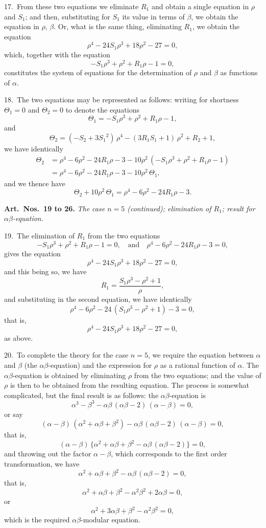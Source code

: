 \documentclass[11pt,a4paper]{book}
\begin{document}
17.\ From these two equations we eliminate $R_1$ and obtain a single equation in $\rho$ and
$S_1$; and then, substituting for $S_1$ its value in terms of $\beta$, we obtain the equation in
$\rho$, $\beta$. Or, what is the same thing, eliminating $R_1$, we obtain the equation
\[
\rho^4 - 24S_1 \rho^3 + 18\rho^2 - 27 = 0,
\]
which, together with the equation
\[
-S_1 \rho^3 + \rho^2 + R_1 \rho - 1 = 0,
\]
constitutes the system of equations for the determination of $\rho$ and $\beta$ as functions of $\alpha$.

18.\ The two equations may be represented as follows: writing for shortness
$\Theta_1 = 0$ and $\Theta_2 = 0$ to denote the equations
\[
\Theta_1 = -S_1 \rho^3 + \rho^2 + R_1 \rho - 1,
\]
and
\[
\Theta_2 = (-S_2 + 3S_1{}^2)\, \rho^4 - (3R_1 S_1 + 1)\, \rho^2 + R_2 + 1,
\]
we have identically
\begin{align*}
\Theta_2 &= \rho^4 - 6\rho^2 - 24R_1 \rho - 3
- 10\rho^2\, (-S_1 \rho^3 + \rho^2 + R_1 \rho - 1)\\
&= \rho^4 - 6\rho^2 - 24R_1 \rho - 3 - 10\rho^2\, \Theta_1,
\end{align*}
and we thence have
\[
\Theta_2 + 10\rho^2\, \Theta_1 = \rho^4 - 6\rho^2 - 24R_1 \rho - 3.
\]

\newpage
\noindent\textbf{Art.\ Nos.\ 19 to 26.} \textit{The case $n = 5$ (continued); elimination of $R_1$; result for $\alpha\beta$-equation.}

19.\ The elimination of $R_1$ from the two equations
\[
-S_1 \rho^3 + \rho^2 + R_1 \rho - 1 = 0, \quad \text{and} \quad
\rho^4 - 6\rho^2 - 24R_1 \rho - 3 = 0,
\]
gives the equation
\[
\rho^4 - 24S_1 \rho^3 + 18\rho^2 - 27 = 0,
\]
and this being so, we have
\[
R_1 = \frac{S_1 \rho^3 - \rho^2 + 1}{\rho},
\]
and substituting in the second equation, we have identically
\[
\rho^4 - 6\rho^2 - 24\, (S_1 \rho^3 - \rho^2 + 1) - 3 = 0,
\]
that is,
\[
\rho^4 - 24S_1 \rho^3 + 18\rho^2 - 27 = 0,
\]
as above.

20.\ To complete the theory for the case $n = 5$, we require the equation between $\alpha$
and $\beta$ (the $\alpha\beta$-equation) and the expression for $\rho$ as a rational function of $\alpha$.
The $\alpha\beta$-equation is obtained by eliminating $\rho$ from the two equations; and the value
of $\rho$ is then to be obtained from the resulting equation. The process is somewhat
complicated, but the final result is as follows: the $\alpha\beta$-equation is
\[
\alpha^3 - \beta^3 - \alpha\beta\, (\alpha\beta - 2)\, (\alpha - \beta) = 0,
\]
or say
\[
(\alpha - \beta)\, (\alpha^2 + \alpha\beta + \beta^2) - \alpha\beta\, (\alpha\beta - 2)\, (\alpha - \beta) = 0,
\]
that is,
\[
(\alpha - \beta)\, \{\alpha^2 + \alpha\beta + \beta^2 - \alpha\beta\, (\alpha\beta - 2)\} = 0,
\]
and throwing out the factor $\alpha - \beta$, which corresponds to the first order transformation,
we have
\[
\alpha^2 + \alpha\beta + \beta^2 - \alpha\beta\, (\alpha\beta - 2) = 0,
\]
that is,
\[
\alpha^2 + \alpha\beta + \beta^2 - \alpha^2\beta^2 + 2\alpha\beta = 0,
\]
or
\[
\alpha^2 + 3\alpha\beta + \beta^2 - \alpha^2\beta^2 = 0,
\]
which is the required $\alpha\beta$-modular equation.
\end{document}

